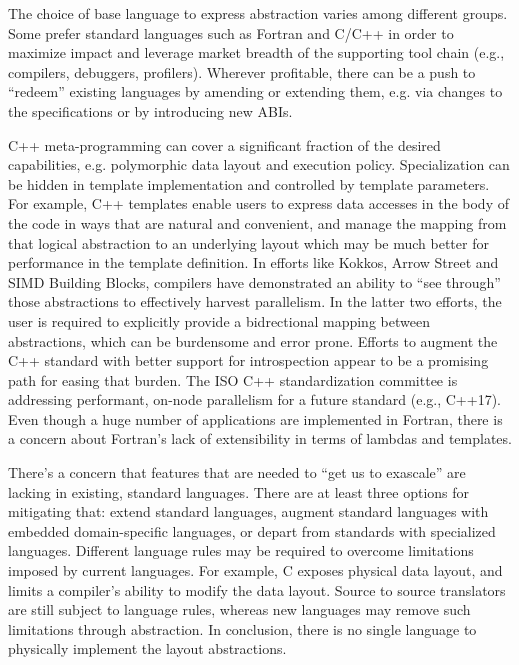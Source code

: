The choice of base language to express abstraction varies among
different groups. Some prefer standard languages such as Fortran and
C/C++ in order to maximize impact and leverage market breadth of the
supporting tool chain (e.g., compilers, debuggers, profilers).
Wherever profitable, there can be a push to ``redeem'' existing
languages by amending or extending them, e.g. via changes to the
specifications or by introducing new ABIs. 

C++ meta-programming can cover a significant fraction of the desired
capabilities, e.g. polymorphic data layout and execution policy.
Specialization can be hidden in template implementation and controlled
by template parameters.  For example, C++ templates enable users to
express data accesses in the body of the code in ways that are natural
and convenient, and manage the mapping from that logical abstraction
to an underlying layout which may be much better for performance in
the template definition.  In efforts like Kokkos, Arrow Street and
SIMD Building Blocks,  compilers have
demonstrated an ability to ``see through'' those abstractions to
effectively harvest parallelism.  In the latter two efforts, the user
is required to explicitly provide a bidrectional mapping between
abstractions, which can be burdensome and error prone.  Efforts to
augment the C++ standard with better support for introspection appear
to be a promising path for easing that burden.  The ISO C++
standardization committee is addressing performant, on-node
parallelism for a future standard (e.g., C++17).  Even though a huge
number of applications are implemented in Fortran, there is a concern
about Fortran's lack of extensibility in terms of lambdas and
templates.

There's a concern that features that are needed to ``get us to
exascale'' are lacking in existing, standard languages.  There are at
least three options for mitigating that: extend standard languages,
augment standard languages with embedded domain-specific languages, or
depart from standards with specialized languages.  Different language
rules may be required to overcome limitations imposed by current
languages. For example, C exposes physical data layout, and limits a
compiler's ability to modify the data layout. Source to source
translators are still subject to language rules, whereas new languages
may remove such limitations through abstraction.  In conclusion, there
is no single language to physically implement the layout abstractions.

